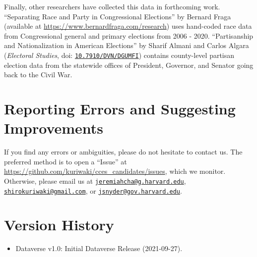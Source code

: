 \documentclass[12pt]{article}
\begin{document}
Finally, other researchers have collected this data in forthcoming work. ``Separating Race and Party in Congressional
Elections'' by Bernard Fraga (available at \url{https://www.bernardfraga.com/research}) uses hand-coded race data from Congressional general and primary elections from 2006 - 2020. ``Partisanship and Nationalization in American Elections'' by Sharif Almani and Carlos Algara (\emph{Electoral Studies}, doi: \href{https://doi.org/10.7910/DVN/DGUMFI}{\texttt{10.7910/DVN/DGUMFI}}) contains county-level partisan election data from the statewide offices of President, Governor, and Senator going back to the Civil War. 

\section{Reporting Errors and Suggesting Improvements}

If you find any errors or ambiguities, please do not hesitate to contact us. The preferred method is to open a ``Issue'' at \url{https://github.com/kuriwaki/cces_candidates/issues}, which we monitor. Otherwise, please email us at \href{mailto:jeremiahcha@g.harvard.edu}{\texttt{jeremiahcha@g.harvard.edu}}, \href{mailto:shirokuriwaki@gmail.com}{\texttt{shirokuriwaki@gmail.com}}, or \href{mailto:jsnyder@gov.harvard.edu}{\texttt{jsnyder@gov.harvard.edu}}.



\section{Version History}

\begin{itemize}
\item Dataverse v1.0: Initial Dataverse Release (2021-09-27).
\end{itemize}	


	
\end{document}
